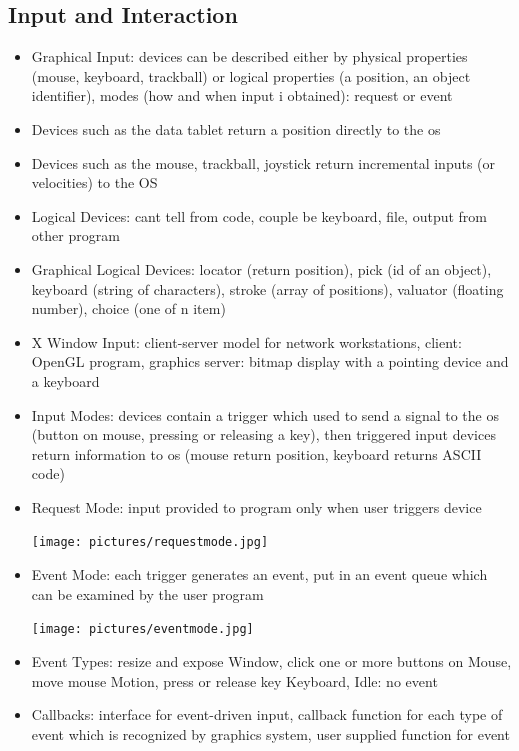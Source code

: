 \documentclass[11pt,a4paper]{article}
\begin{document}
	\subsection{Input and Interaction}
	\begin{itemize}
		\item Graphical Input: devices can be described either by physical properties (mouse, keyboard, trackball) or logical properties (a position, an object identifier), modes (how and when input i obtained): request or event
		\item Devices such as the data tablet return a position directly to the os
		\item Devices such as the mouse, trackball, joystick return incremental inputs (or velocities) to the OS
		\item Logical Devices: cant tell from code, couple be keyboard, file, output from other program
		\item Graphical Logical Devices: locator (return position), pick (id of an object), keyboard (string of characters), stroke (array of positions), valuator (floating number), choice (one of n item)
		\item X Window Input: client-server model for network workstations, client: OpenGL program, graphics server: bitmap display with a pointing device and a keyboard
		\item Input Modes: devices contain a trigger which used to send a signal to the os (button on mouse, pressing or releasing a key), then triggered input devices return information to os (mouse return position, keyboard returns ASCII code)
		\item Request Mode: input provided to program only when user triggers device 
		\begin{center}
			\texttt{[image: pictures/requestmode.jpg]}
		\end{center}
		\item Event Mode: each trigger generates an event, put in an event queue which can be examined by the user program
		\begin{center}
			\texttt{[image: pictures/eventmode.jpg]}
		\end{center}
		\item Event Types: resize and expose Window, click one or more buttons on Mouse, move mouse Motion, press or release key Keyboard, Idle: no event
		\item Callbacks: interface for event-driven input, callback function for each type of event which is recognized by graphics system, user supplied function for event

\end{itemize}
\end{document}
